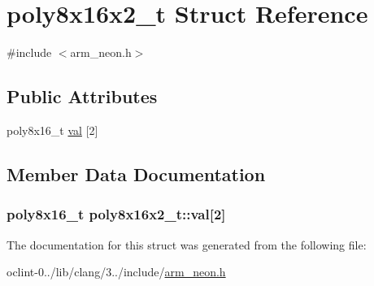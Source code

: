 \hypertarget{structpoly8x16x2__t}{\section{poly8x16x2\-\_\-t Struct Reference}
\label{structpoly8x16x2__t}
}


{\ttfamily \#include $<$arm\-\_\-neon.\-h$>$}

\subsection*{Public Attributes}
\begin{DoxyCompactItemize}
\item 
poly8x16\-\_\-t \hyperlink{structpoly8x16x2__t_a5447f354dc39ca472ea992649423bd12}{val} \mbox{[}2\mbox{]}
\end{DoxyCompactItemize}


\subsection{Member Data Documentation}
\hypertarget{structpoly8x16x2__t_a5447f354dc39ca472ea992649423bd12}{
\subsubsection[{val}]{\setlength{\rightskip}{0pt plus 5cm}poly8x16\-\_\-t poly8x16x2\-\_\-t\-::val\mbox{[}2\mbox{]}}}\label{structpoly8x16x2__t_a5447f354dc39ca472ea992649423bd12}


The documentation for this struct was generated from the following file\-:\begin{DoxyCompactItemize}
\item 
oclint-\/0../lib/clang/3../include/\hyperlink{arm__neon_8h}{arm\-\_\-neon.\-h}\end{DoxyCompactItemize}
